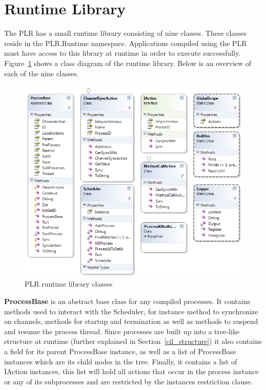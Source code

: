 \section{Runtime Library}

	The PLR has a small runtime library consisting of nine classes. These classes
	reside in the \textsf{PLR.Runtime} namespace. Applications compiled using 
	the PLR must have access to this library at runtime in order to execute 
	successfully. Figure~\ref{fig:runtime_library} shows a class diagram of the 
	runtime library. Below is an overview of each of the nine classes.

	\begin{figure}[h!]
		\centering
		\includegraphics[scale=0.5]{RuntimeLibrary.png}
		\caption{PLR runtime library classes}
		\label{fig:runtime_library}
	\end{figure}

	\textbf{ProcessBase} is an abstract base class for any compiled processes.
	It contains methods used to interact with the \textsf{Scheduler},
	for instance method to synchronize on channels, methods for startup and
	termination as well as methods to suspend and resume the process thread.
	Since processes are built up into a tree-like structure at runtime (further 
	explained in Section~\ref{cil_structure}) it also contains a field for its 
	parent \textsf{ProcessBase} instance, as well as a list of 
	\textsf{ProcessBase} instances which are its child nodes in the tree. 
	Finally, it contains a list of \textsf{IAction} instances, this list will 
	hold all actions that occur in the process instance or any of its 
	subprocesses and are restricted by the instances restriction clause.
	
